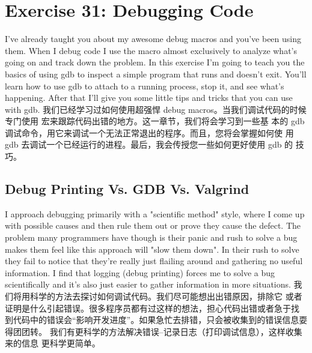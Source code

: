 \chapter{Exercise 31: Debugging Code}

I've already taught you about my awesome debug macros and you've been using
them.  When I debug code I use the  macro almost exclusively to
analyze what's going on and track down the problem.  In this exercise I'm going
to teach you the basics of using gdb to inspect a simple program that runs and
doesn't exit.  You'll learn how to use gdb to attach to a running process, stop
it, and see what's happening.  After that I'll give you some little tips and
tricks that you can use with gdb.
我们已经学习过如何使用超强悍 debug macros。当我们调试代码的时候专门使用
宏来跟踪代码出错的地方。这一章节，我们将会学习到一些基
本的 gdb 调试命令，用它来调试一个无法正常退出的程序。而且，您将会掌握如何使
用 gdb 去调试一个已经运行的进程。最后，我会传授您一些如何更好使用 gdb 的
技巧。

\section{Debug Printing Vs. GDB Vs. Valgrind}

I approach debugging primarily with a "scientific method" style, where I come
up with possible causes and then rule them out or prove they cause the defect.
The problem many programmers have though is their panic and rush to solve a bug
makes them feel like this approach will "slow them down".  In their rush to
solve they fail to notice that they're really just flailing around and
gathering no useful information.  I find that logging (debug printing) forces
me to solve a bug scientifically and it's also just easier to gather
information in more situations.
我们将用科学的方法去探讨如何调试代码。我们尽可能想出出错原因，排除它
或者证明是什么引起错误。很多程序员都有过这样的想法，担心代码出错或者急于找
到代码中的错误会“影响开发进度”。如果急忙去排错，只会被收集到的错误信息耍得团团转。
我们有更科学的方法解决错误--记录日志（打印调试信息），这样收集来的信息
更科学更简单。

